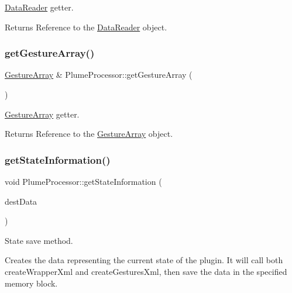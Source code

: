 \mbox{\hyperlink{class_data_reader}{Data\+Reader}} getter. 

\begin{DoxyReturn}{Returns}
Reference to the \mbox{\hyperlink{class_data_reader}{Data\+Reader}} object. 
\end{DoxyReturn}
\mbox{\label{class_plume_processor_a691a2f342167e257fabf74d0bb76a563}} 
\subsubsection{\texorpdfstring{get\+Gesture\+Array()}{getGestureArray()}}
{\footnotesize\ttfamily \mbox{\hyperlink{class_gesture_array}{Gesture\+Array}} \& Plume\+Processor\+::get\+Gesture\+Array (\begin{DoxyParamCaption}{ }\end{DoxyParamCaption})}



\mbox{\hyperlink{class_gesture_array}{Gesture\+Array}} getter. 

\begin{DoxyReturn}{Returns}
Reference to the \mbox{\hyperlink{class_gesture_array}{Gesture\+Array}} object. 
\end{DoxyReturn}
\mbox{\label{class_plume_processor_ae06dd312c3dc3ba7389ce44fd74cbc18}} 
\subsubsection{\texorpdfstring{get\+State\+Information()}{getStateInformation()}}
{\footnotesize\ttfamily void Plume\+Processor\+::get\+State\+Information (\begin{DoxyParamCaption}\item[{Memory\+Block \&}]{dest\+Data }\end{DoxyParamCaption})\hspace{0.3cm}{\ttfamily [override]}}



State save method. 

Creates the data representing the current state of the plugin. It will call both create\+Wrapper\+Xml and create\+Gestures\+Xml, then save the data in the specified memory block.


